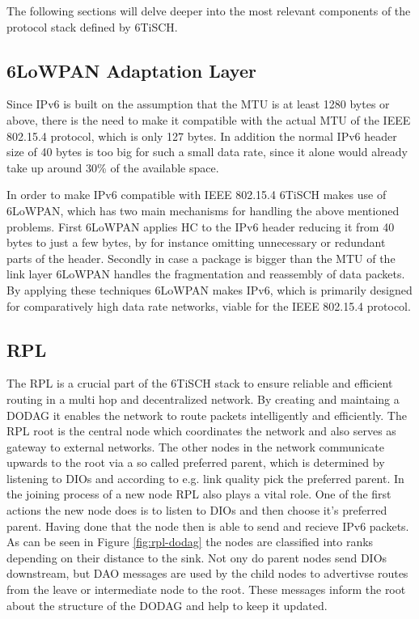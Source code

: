 \documentclass{comnets-thesis}
\begin{document}
The following sections will delve deeper into the most relevant components of the protocol stack defined by \ac{6TiSCH}.



\subsection{\ac{6LoWPAN} Adaptation Layer}
Since IPv6 is built on the assumption that the \ac{MTU} is at least 1280 bytes or above, there is the need to make it compatible with the actual \ac{MTU} of the IEEE 802.15.4 protocol, which is only 127 bytes. In addition the normal IPv6 header size of 40 bytes is too big for such a small data rate, since it alone would already take up around 30\% of the available space.

In order to make IPv6 compatible with IEEE 802.15.4 \ac{6TiSCH} makes use of \acf{6LoWPAN}, which has two main mechanisms for handling the above mentioned problems.
First \ac{6LoWPAN} applies \ac{HC} \cite{RFC6282} to the IPv6 header reducing it from 40 bytes to just a few bytes, by for instance omitting unnecessary or redundant parts of the header. 
Secondly in case a package is bigger than the \ac{MTU} of the link layer \ac{6LoWPAN} handles the fragmentation and reassembly \cite{RFC4944} of data packets. 
By applying these techniques 6LoWPAN makes IPv6, which is primarily designed for comparatively high data rate networks, viable for the IEEE 802.15.4 protocol. 



\subsection{\ac{RPL}}
The \acf{RPL} \cite{RFC6551} is a crucial part of the 6TiSCH stack to ensure reliable and efficient routing in a multi hop and decentralized network. By creating and maintaing a \ac{DODAG} it enables the network to route packets intelligently and efficiently.
The \ac{RPL} root is the central node which coordinates the network and also serves as gateway to external networks. The other nodes in the network communicate upwards to the root via a so called preferred parent, which is determined by listening to \acp{DIO} and according to e.g. link quality pick the preferred parent.
In the joining process of a new node RPL also plays a vital role. One of the first actions the new node does is to listen to \acp{DIO} and then choose it's preferred parent. Having done that the node then is able to send and recieve IPv6 packets.
As can be seen in Figure \ref{fig:rpl-dodag} the nodes are classified into ranks depending on their distance to the sink. Not ony do parent nodes send \acp{DIO} downstream, but \ac{DAO} messages are used by the child nodes to advertivse routes from the leave or intermediate node to the root. These messages inform the root about the structure of the \ac{DODAG} and help to keep it updated.
\end{document}
